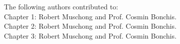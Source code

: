 \noindent The following authors contributed to:\\
Chapter 1: Robert Muschong and Prof. Cosmin Bonchis.\\
Chapter 2: Robert Muschong and Prof. Cosmin Bonchis.\\
Chapter 3: Robert Muschong and Prof. Cosmin Bonchis.\\

